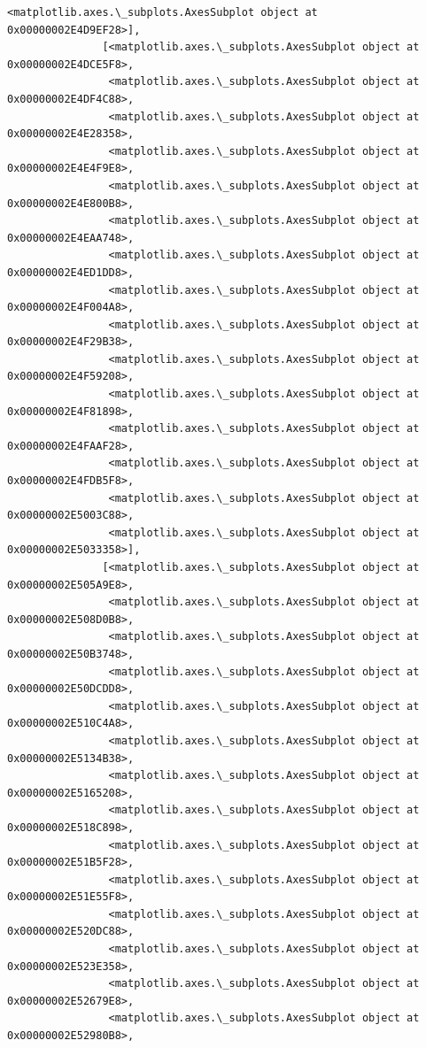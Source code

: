 \documentclass[11pt]{article}
\begin{document}
\begin{Verbatim}[commandchars=\\\{\}]
                <matplotlib.axes.\_subplots.AxesSubplot object at 0x00000002E4D9EF28>],
               [<matplotlib.axes.\_subplots.AxesSubplot object at 0x00000002E4DCE5F8>,
                <matplotlib.axes.\_subplots.AxesSubplot object at 0x00000002E4DF4C88>,
                <matplotlib.axes.\_subplots.AxesSubplot object at 0x00000002E4E28358>,
                <matplotlib.axes.\_subplots.AxesSubplot object at 0x00000002E4E4F9E8>,
                <matplotlib.axes.\_subplots.AxesSubplot object at 0x00000002E4E800B8>,
                <matplotlib.axes.\_subplots.AxesSubplot object at 0x00000002E4EAA748>,
                <matplotlib.axes.\_subplots.AxesSubplot object at 0x00000002E4ED1DD8>,
                <matplotlib.axes.\_subplots.AxesSubplot object at 0x00000002E4F004A8>,
                <matplotlib.axes.\_subplots.AxesSubplot object at 0x00000002E4F29B38>,
                <matplotlib.axes.\_subplots.AxesSubplot object at 0x00000002E4F59208>,
                <matplotlib.axes.\_subplots.AxesSubplot object at 0x00000002E4F81898>,
                <matplotlib.axes.\_subplots.AxesSubplot object at 0x00000002E4FAAF28>,
                <matplotlib.axes.\_subplots.AxesSubplot object at 0x00000002E4FDB5F8>,
                <matplotlib.axes.\_subplots.AxesSubplot object at 0x00000002E5003C88>,
                <matplotlib.axes.\_subplots.AxesSubplot object at 0x00000002E5033358>],
               [<matplotlib.axes.\_subplots.AxesSubplot object at 0x00000002E505A9E8>,
                <matplotlib.axes.\_subplots.AxesSubplot object at 0x00000002E508D0B8>,
                <matplotlib.axes.\_subplots.AxesSubplot object at 0x00000002E50B3748>,
                <matplotlib.axes.\_subplots.AxesSubplot object at 0x00000002E50DCDD8>,
                <matplotlib.axes.\_subplots.AxesSubplot object at 0x00000002E510C4A8>,
                <matplotlib.axes.\_subplots.AxesSubplot object at 0x00000002E5134B38>,
                <matplotlib.axes.\_subplots.AxesSubplot object at 0x00000002E5165208>,
                <matplotlib.axes.\_subplots.AxesSubplot object at 0x00000002E518C898>,
                <matplotlib.axes.\_subplots.AxesSubplot object at 0x00000002E51B5F28>,
                <matplotlib.axes.\_subplots.AxesSubplot object at 0x00000002E51E55F8>,
                <matplotlib.axes.\_subplots.AxesSubplot object at 0x00000002E520DC88>,
                <matplotlib.axes.\_subplots.AxesSubplot object at 0x00000002E523E358>,
                <matplotlib.axes.\_subplots.AxesSubplot object at 0x00000002E52679E8>,
                <matplotlib.axes.\_subplots.AxesSubplot object at 0x00000002E52980B8>,

\end{Verbatim}
\end{document}
